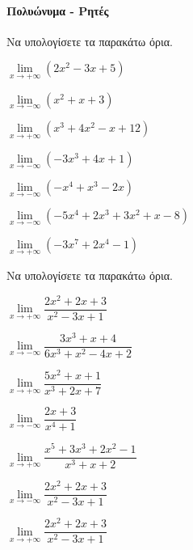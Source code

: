 \documentclass[11pt,a4paper,modern]{FFExercises}
\begin{document}
\paragraph{Πολυώνυμα - Ρητές}
\askhsh Να υπολογίσετε τα παρακάτω όρια.
\begin{alist}
\item $\lim\limits_{x\to+\infty}{\left(2x^2-3x+5\right)}$
\item $\lim\limits_{x\to-\infty}{\left(x^2+x+3\right)}$
\item $\lim\limits_{x\to+\infty}{\left(x^3+4x^2-x+12\right)}$
\item $\lim\limits_{x\to-\infty}{\left(-3x^3+4x+1\right)}$
\item $\lim\limits_{x\to-\infty}{\left(-x^4+x^3-2x\right)}$
\item $\lim\limits_{x\to-\infty}{\left(-5x^4+2x^3+3x^2+x-8\right)}$
\item $\lim\limits_{x\to+\infty}{\left(-3x^7+2x^4-1\right)}$
\end{alist}
\askhsh Να υπολογίσετε τα παρακάτω όρια.
\begin{alist}
\item $\lim\limits_{x\to+\infty}{\dfrac{2x^2+2x+3}{x^2-3x+1}}$
\item $\lim\limits_{x\to-\infty}{\dfrac{3x^3+x+4}{6x^3+x^2-4x+2}}$
\item $\lim\limits_{x\to+\infty}{\dfrac{5x^2+x+1}{x^3+2x+7}}$
\item $\lim\limits_{x\to-\infty}{\dfrac{2x+3}{x^4+1}}$
\item $\lim\limits_{x\to+\infty}{\dfrac{x^5+3x^3+2x^2-1}{x^3+x+2}}$
\item $\lim\limits_{x\to-\infty}{\dfrac{2x^2+2x+3}{x^2-3x+1}}$
\item $\lim\limits_{x\to+\infty}{\dfrac{2x^2+2x+3}{x^2-3x+1}}$
\end{alist}
\end{document}
